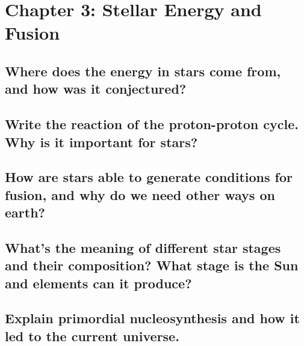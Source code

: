 \section{Chapter 3: Stellar Energy and Fusion}

\subsection{Where does the energy in stars come from, and how was it conjectured?}
\solutionblock{}

\subsection{Write the reaction of the proton-proton cycle. Why is it important for stars?}
\solutionblock{}

\subsection{How are stars able to generate conditions for fusion, and why do we need other ways on earth?}
\solutionblock{}

\subsection{What's the meaning of different star stages and their composition? What stage is the Sun and elements can it produce?}
\solutionblock{}

\subsection{Explain primordial nucleosynthesis and how it led to the current universe.}
\solutionblock{}
